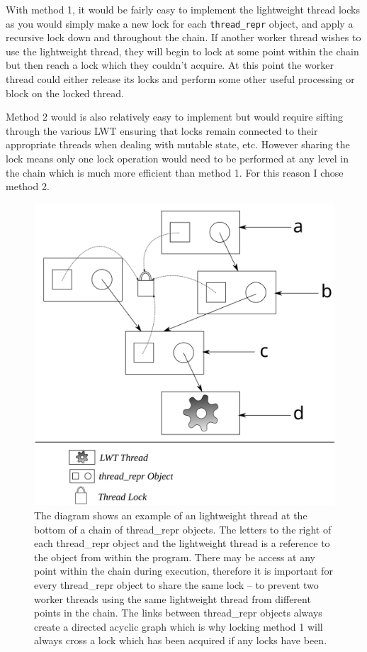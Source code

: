 \documentclass[12pt,twoside,notitlepage]{report}
\begin{document}
With method 1, it would be fairly easy to implement the lightweight thread locks as you would simply make a new lock for each {\tt thread\_repr} object, and apply a recursive lock down and throughout the chain. If another worker thread
wishes to use the lightweight thread, they will begin to lock at some point within the chain but then reach a lock which they couldn't acquire. At this point the worker thread could either release its locks and perform some other
useful processing or block on the locked thread.

Method 2 would is also relatively easy to implement but would require sifting through the various LWT ensuring that locks remain connected to their appropriate threads when dealing with mutable state, etc. However sharing the lock
means only one lock operation would need to be performed at any level in the chain which is much more efficient than method 1. For this reason I chose method 2.

\begin{figure}[h!]
\includegraphics[width=\linewidth]{thread_repr}
\caption{The diagram shows an example of an lightweight thread at the bottom of a chain of thread\_repr objects. The letters to the right of each thread\_repr object and the lightweight thread is a reference to the object from within the program. There
may be access at any point within the chain during execution, therefore it is important for every thread\_repr object to share the same lock -- to prevent two worker threads using the same lightweight thread from different points in the
chain. The links between thread\_repr objects always create a directed acyclic graph which is why locking method 1 will always cross a lock which has been acquired if any locks have been.}
\label{fig:thread_repr}
\end{figure}
\end{document}
